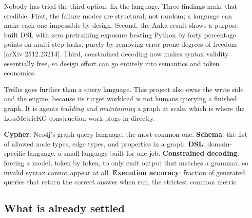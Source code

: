 \documentclass[11pt]{article}
\begin{document}
Nobody has tried the third option: fix the language. Three findings make that credible. First, the failure modes are structural, not random; a language can make each one impossible by design. Second, the Anka result shows a purpose-built DSL with zero pretraining exposure beating Python by forty percentage points on multi-step tasks, purely by removing error-prone degrees of freedom [arXiv 2512.23214]. Third, constrained decoding now makes syntax validity essentially free, so design effort can go entirely into semantics and token economics.

Trellis goes further than a query language. This project also owns the write side and the engine, because its target workload is not humans querying a finished graph. It is agents \emph{building and maintaining} a graph at scale, which is where the LossMetricKG construction work plugs in directly.

\begin{glossbox}
\textbf{Cypher}: Neo4j's graph query language, the most common one. \textbf{Schema}: the list of allowed node types, edge types, and properties in a graph. \textbf{DSL}: domain-specific language, a small language built for one job. \textbf{Constrained decoding}: forcing a model, token by token, to only emit output that matches a grammar, so invalid syntax cannot appear at all. \textbf{Execution accuracy}: fraction of generated queries that return the correct answer when run, the strictest common metric.
\end{glossbox}

\subsection{What is already settled}
\end{document}
